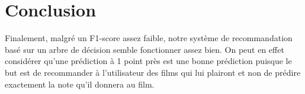 \documentclass{article}
\begin{document}
\section{Conclusion}
Finalement, malgré un F1-score assez faible, notre système de recommandation
basé sur un arbre de décision semble fonctionner assez bien. On peut en effet
considérer qu'une prédiction à 1 point près est une bonne prédiction puisque
le but est de recommander à l'utilisateur des films qui lui plairont et non
de prédire exactement la note qu'il donnera au film.
\end{document}
